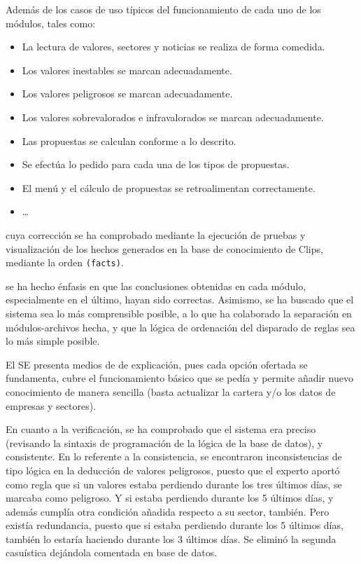 \documentclass[a4paper,11pt]{article}
\begin{document}
Además de los casos de uso típicos del funcionamiento de cada uno de los módulos, tales como:
\begin{itemize}
 \item La lectura de valores, sectores y noticias se realiza de forma comedida.
 \item Los valores inestables se marcan adecuadamente.
 \item Los valores peligrosos se marcan adecuadamente.
 \item Los valores sobrevalorados e infravalorados se marcan adecuadamente.
 \item Las propuestas se calculan conforme a lo descrito.
 \item Se efectúa lo pedido para cada una de los tipos de propuestas.
 \item El menú y el cálculo de propuestas se retroalimentan correctamente.
 \item \ldots
\end{itemize}

cuya corrección se ha comprobado mediante la ejecución de pruebas y visualización de los hechos generados en la base de
conocimiento de Clips, mediante la orden \texttt{(facts)}.

se ha hecho énfasis en que las conclusiones obtenidas en cada módulo, especialmente en el último, hayan sido correctas. Asimismo,
se ha buscado que el sistema sea lo más comprensible posible, a lo que ha colaborado la separación en módulos-archivos hecha, y
que la lógica de ordenación del disparado de reglas sea lo más simple posible.

El SE presenta medios de de explicación, pues cada opción ofertada se fundamenta, cubre el funcionamiento básico que se pedía
y permite añadir nuevo conocimiento de manera sencilla (basta actualizar la cartera y/o los datos de empresas y sectores).

En cuanto a la verificación, se ha comprobado que el sistema era preciso (revisando la sintaxis de programación de la lógica
de la base de datos), y consistente. En lo referente a la consistencia, se encontraron inconsistencias de tipo lógica en la
deducción de valores peligrosos, puesto que el experto aportó como regla que si un valores estaba perdiendo durante los
tres últimos días, se marcaba como peligroso. Y si estaba perdiendo durante los 5 últimos días, y además cumplía otra condición
añadida respecto a su sector, también. Pero existía redundancia, puesto que si estaba perdiendo durante los 5 últimos días,
también lo estaría haciendo durante los 3 últimos días. Se eliminó la segunda casuística dejándola comentada en base de datos.
\end{document}

